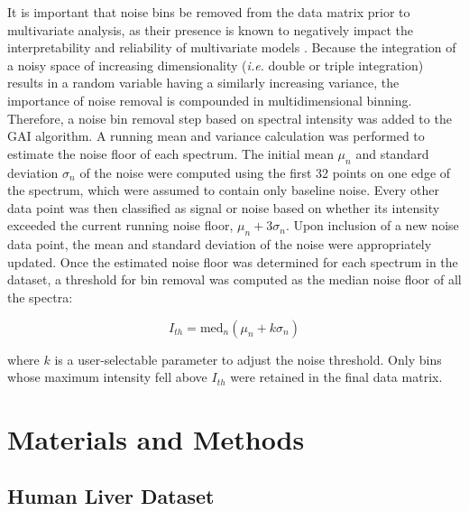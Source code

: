 \begin{doublespace}
It is important that noise bins be removed from the data matrix prior to
multivariate analysis, as their presence is known to negatively impact the
interpretability and reliability of multivariate models
\cite{halouska:jmr2006,bro:anmeth2014}. Because the integration of a
noisy space of increasing dimensionality ({\it i.e.} double or triple
integration) results in a random variable having a similarly increasing
variance, the importance of noise removal is compounded in multidimensional
binning. Therefore, a noise bin removal step based on spectral intensity was
added to the GAI algorithm. A running mean and variance calculation was
performed to estimate the noise floor of each spectrum. The initial mean
$\mu_n$ and standard deviation $\sigma_n$ of the noise were computed using the
first 32 points on one edge of the spectrum, which were assumed to contain only
baseline noise. Every other data point was then classified as signal or noise
based on whether its intensity exceeded the current running noise floor,
$\mu_n + 3 \sigma_n$. Upon inclusion of a new noise data point, the mean and
standard deviation of the noise were appropriately updated. Once the estimated
noise floor was determined for each spectrum in the dataset, a threshold for
bin removal was computed as the median noise floor of all the spectra:

\begin{equation}
I_{th} = \mathrm{med}_n (\mu_n + k \sigma_n)
\end{equation}

where $k$ is a user-selectable parameter to adjust the noise threshold. Only
bins whose maximum intensity fell above $I_{th}$ were retained in the final
data matrix.
\end{doublespace}

\section{Materials and Methods}

\subsection{Human Liver Dataset}

